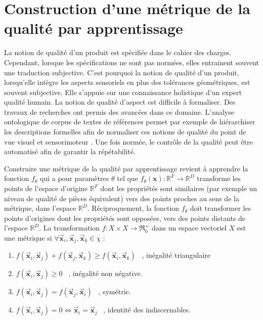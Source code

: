 \section{Construction d'une métrique de la qualité par apprentissage} \label{sec:metric_learning}
La notion de qualité d'un produit est spécifiée dans le cahier des charges.
Cependant, lorsque les spécifications ne sont pas normées, elles entrainent souvent une traduction subjective.
C'est pourquoi la notion de qualité d'un produit, lorsqu'elle intègre les aspects sensoriels en plus des tolérances géométriques, est souvent subjective.
Elle s'appuie sur une connaissance holistique d'un expert qualité humain. La notion de qualité d'aspect est difficile à formaliser.
Des travaux de recherches ont permis des avancées dans ce domaine.
L'analyse ontologique de corpus de textes de références permet par exemple de hiérarchiser les descriptions formelles afin de normaliser ces notions de qualité du point de vue visuel \cite{baudet_maitrise_2012} et sensorimoteur \cite{albert_smart_2017}.
Une fois normée, le contrôle de la qualité peut être automatisé \cite{desage_contraintes_2015, pitard_metrologie_2016, lacombe_exploitation_2018a, albert_maitrise_2019} afin de garantir la répétabilité.

Construire une métrique de la qualité par apprentissage revient à apprendre la fonction $f_{\theta}$ qui a pour paramètres $\theta$ tel que $f_{\theta}(\mathbf{x}) : \mathbb{R}^{F} \rightarrow \mathbb{R}^{D}$ transforme les points de l'espace d'origine $\mathbb{R}^{F}$ dont les propriétés sont similaires (par exemple un niveau de qualité de pièces équivalent) vers des points proches au sens de la métrique, dans l'espace $\mathbb{R}^{D}$.
Réciproquement, la fonction $f_{\theta}$ doit transformer les points d'origines dont les propriétés sont opposées, vers des points distants de l'espace $\mathbb{R}^{D}$.
La transformation $f : X \times X \rightarrow \Re_{0}^{+} $ dans un espace vectoriel $X$ est une métrique si $\forall \vec{\mathbf{x}}_{i}, \vec{\mathbf{x}}_{j}, \vec{\mathbf{x}}_{k} \in \chi$ :

\begin{enumerate}
\item $f\left(\vec{\mathbf{x}}_{i}, \vec{\mathbf{x}}_{j}\right) + f\left(\vec{\mathbf{x}}_{j}, \vec{\mathbf{x}}_{k}\right) \geq f\left(\vec{\mathbf{x}}_{i}, \vec{\mathbf{x}}_{k}\right)$ \ , inégalité triangulaire
\item $f\left(\vec{\mathbf{x}}_{i}, \vec{\mathbf{x}}_{j}\right) \geq 0$ \ , inégalité non négative.
\item $f\left(\vec{\mathbf{x}}_{i}, \vec{\mathbf{x}}_{j}\right)=f\left(\vec{\mathbf{x}}_{j}, \vec{\mathbf{x}}_{i}\right)$ \ , symétrie.
\item $f\left(\vec{\mathbf{x}}_{i}, \vec{\mathbf{x}}_{j}\right)=0 \Longleftrightarrow \vec{\mathbf{x}}_{i}=\vec{\mathbf{x}}_{j}$ \ , identité des indiscernables.
\end{enumerate}

